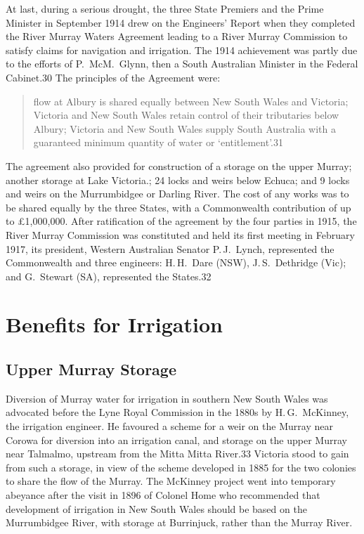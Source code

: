 At last, during a serious drought, the three State Premiers and the
Prime Minister in September 1914 drew on the Engineers' Report when
they completed the River Murray Waters Agreement leading to a River
Murray Commission to satisfy claims for navigation and irrigation. The
1914 achievement was partly due to the efforts of P.~McM.~Glynn, then
a South Australian Minister in the Federal Cabinet.30 The principles
of the Agreement were:
\begin{quote}
	flow at Albury is shared equally between New South Wales and
	Victoria; Victoria and New South Wales retain control of their
	tributaries below Albury; Victoria and New South Wales supply
	South Australia with a guaranteed minimum quantity of water or
	`entitlement'.31
\end{quote}

The agreement also provided for construction of a storage on the upper
Murray; another storage at Lake Victoria.; 24 locks and weirs below
Echuca; and 9 locks and weirs on the Murrumbidgee or Darling River.
The cost of any works was to be shared equally by the three States,
with a Commonwealth contribution of up to \pounds1,000,000. After
ratification of the agreement by the four parties in 1915, the River
Murray Commission was constituted and held its first meeting in
February 1917, its president, Western Australian Senator P.\,J.~Lynch,
represented the Commonwealth and three engineers: H.\,H.~Dare (NSW),
J.\,S.~Dethridge (Vic); and G.~Stewart (SA), represented the States.32

\section{Benefits for Irrigation}

\subsection{Upper Murray Storage}

Diversion of Murray water for irrigation in southern New South Wales
was advocated before the Lyne Royal Commission in the 1880s by
H.\,G.~McKinney, the irrigation engineer.  He favoured a scheme for a
weir on the Murray near Corowa for diversion into an irrigation canal,
and storage on the upper Murray near Talmalmo, upstream from the Mitta
Mitta River.33 Victoria stood to gain from such a storage, in view of
the scheme developed in 1885 for the two colonies to share the flow of
the Murray.  The McKinney project went into temporary abeyance after
the visit in 1896 of Colonel Home who recommended that development of
irrigation in New South Wales should be based on the Murrumbidgee
River, with storage at Burrinjuck, rather than the Murray River.

